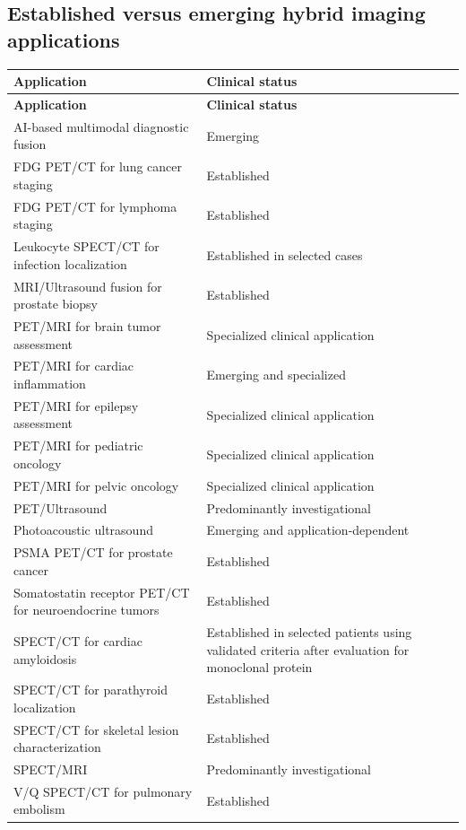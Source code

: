 \subsection{Established versus emerging hybrid imaging applications}
\begin{longtable}{@{}p{}p{}@{}}
\toprule
\textbf{Application} & \textbf{Clinical status} \\
\midrule
\endfirsthead
\toprule
\textbf{Application} & \textbf{Clinical status} \\
\midrule
\endhead
AI-based multimodal diagnostic fusion & Emerging \\
FDG PET/CT for lung cancer staging & Established \\
FDG PET/CT for lymphoma staging & Established \\
Leukocyte SPECT/CT for infection localization & Established in selected cases \\
MRI/Ultrasound fusion for prostate biopsy & Established \\
PET/MRI for brain tumor assessment & Specialized clinical application \\
PET/MRI for cardiac inflammation & Emerging and specialized \\
PET/MRI for epilepsy assessment & Specialized clinical application \\
PET/MRI for pediatric oncology & Specialized clinical application \\
PET/MRI for pelvic oncology & Specialized clinical application \\
PET/Ultrasound & Predominantly investigational \\
Photoacoustic ultrasound & Emerging and application-dependent \\
PSMA PET/CT for prostate cancer & Established \\
Somatostatin receptor PET/CT for neuroendocrine tumors & Established \\
SPECT/CT for cardiac amyloidosis & Established in selected patients using validated criteria after evaluation for monoclonal protein \\
SPECT/CT for parathyroid localization & Established \\
SPECT/CT for skeletal lesion characterization & Established \\
SPECT/MRI & Predominantly investigational \\
V/Q SPECT/CT for pulmonary embolism & Established \\
\bottomrule
\end{longtable}

